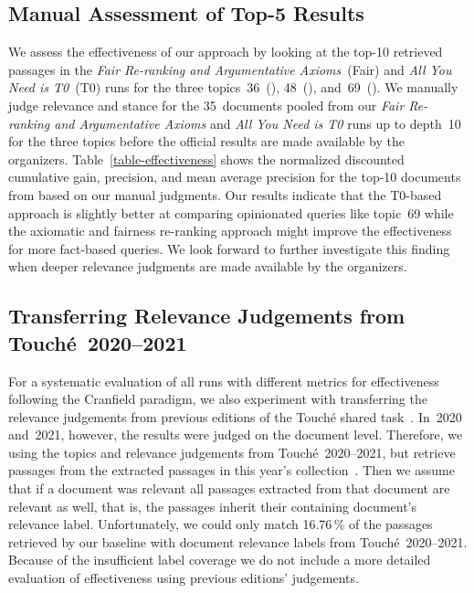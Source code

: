

\subsection{Manual Assessment of Top-5 Results}
% 


We assess the effectiveness of our approach by looking at the top-10 retrieved passages in the \emph{Fair Re-ranking and Argumentative Axioms}~(Fair) and \emph{All You Need is T0}~(T0) runs for the three topics~36~(), 48~(), and~69~().
We manually judge relevance and stance for the 35~documents pooled from our \emph{Fair Re-ranking and Argumentative Axioms} and \emph{All You Need is T0} runs up to depth~10 for the three topics before the official results are made available by the organizers.
Table~\ref{table-effectiveness} shows the normalized discounted cumulative gain, precision, and mean average precision for the top-10 documents from based on our manual judgments.
Our results indicate that the T0-based approach is slightly better at comparing opinionated queries like topic~69 while the axiomatic and fairness re-ranking approach might improve the effectiveness for more fact-based queries.
We look forward to further investigate this finding when deeper relevance judgments are made available by the organizers.

\subsection{Transferring Relevance Judgements from Touché~2020--2021}
\label{transfer-relevance-judgements}

For a systematic evaluation of all runs with different metrics for effectiveness following the Cranfield paradigm, we also experiment with transferring the relevance judgements from previous editions of the Touché shared task~\cite{BondarenkoFBGAPBSWPH2020,BondarenkoGFBAPBSWPH2021}.
In~2020 and~2021, however, the results were judged on the document level.
Therefore, we using the topics and relevance judgements from Touché~2020--2021, but retrieve passages from the extracted passages in this year's collection~\cite{BondarenkoFKSGBPBSWPH2022}.
Then we assume that if a document was relevant all passages extracted from that document are relevant as well, that is, the passages inherit their containing document's relevance label.
Unfortunately, we could only match 16.76\,\% of the passages retrieved by our baseline with document relevance labels from Touché~2020--2021.
Because of the insufficient label coverage we do not include a more detailed evaluation of effectiveness using previous editions' judgements.
